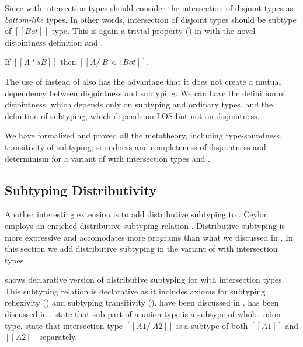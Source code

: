 \noindent Since \cal with intersection types should consider the intersection of disjoint types 
as \emph{bottom-like} types. In other words, intersection of disjoint types
should be subtype of $[[Bot]]$ type.
This is again a trivial property () in \cal 
with the novel disjointness definition and .

\begin{lemma}
  If $[[A *s B]]$ then $[[A /\ B <: Bot]]$.
\label{lemma:discussion:disjoint-types}
\end{lemma}

\noindent The use of  instead of  also has the advantage that it does not
create a mutual dependency between disjointness and subtyping. We can have the definition
of disjointness, which depends only on subtyping and ordinary types, and the definition
of subtyping, which depends on LOS but not on disjointness.

We have formalized and proved all the metatheory, including type-soundness, transitivity of subtyping,
soundness and completeness of disjointness and determinism for a variant of \name with intersection types
and .

\subsection{Subtyping Distributivity}
\label{sec:inter:dist}


Another interesting extension is to add distributive subtyping to \cal.
Ceylon~\cite{muehlboeck2018empowering} employs an enriched 
distributive subtyping relation \cite{barendregt1983filter,barbanera1995intersection}.
Distributive subtyping is more expressive and accomodates more programs than what we discussed in
. In this section we add distributive subtyping in the variant of \cal with
intersection types. 

 shows declarative version of distributive subtyping for \cal with intersection types.
This subtyping relation is declarative as it includes axioms for subtyping reflexivity () and
subtyping transitivity ().  have been
discussed in .  has been discussed in .
 state that sub-part of a union type is a subtype of whole union type.
 state that intersection type $[[A1 /\ A2]]$ is a subtype of both $[[A1]]$
and $[[A2]]$ separately.

